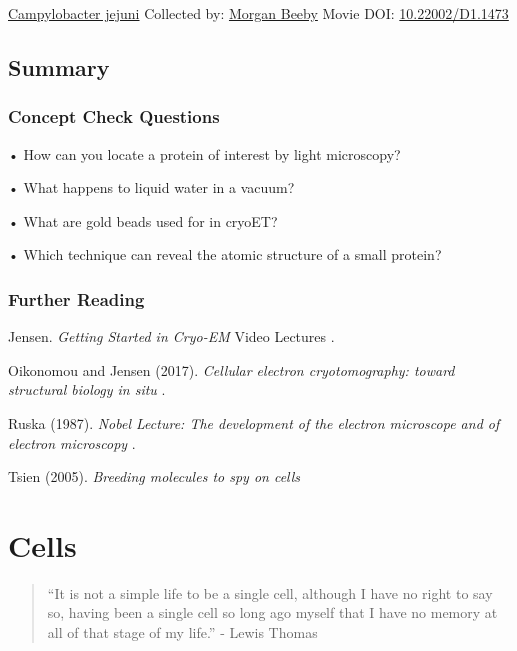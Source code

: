 \documentclass[]{tufte-book}
\begin{document}
\hypertarget{htmlwidget-12e43f16aef9ac033337}{}

\label{fig:1-10a}\protect\hyperlink{tree}{Campylobacter jejuni} Collected by: \protect\hyperlink{morgan_beeby}{Morgan Beeby} Movie DOI: \href{https://doi.org/10.22002/D1.1473}{10.22002/D1.1473}

\hypertarget{summary}{%
\section{Summary}\label{summary}}

\hypertarget{concept-check-questions}{%
\subsection*{Concept Check Questions}\label{concept-check-questions}}

• How can you locate a protein of interest by light microscopy?

• What happens to liquid water in a vacuum?

• What are gold beads used for in cryoET?

• Which technique can reveal the atomic structure of a small protein?

\hypertarget{further-reading}{%
\subsection*{Further Reading}\label{further-reading}}

Jensen. \emph{Getting Started in Cryo-EM} Video Lectures \citep{jensenInternet}.

Oikonomou and Jensen (2017). \emph{Cellular electron cryotomography: toward structural biology in situ} \citep{oikonomou2017}.

Ruska (1987). \emph{Nobel Lecture: The development of the electron microscope and of electron microscopy} \citep{ruska1987}.

Tsien (2005). \emph{Breeding molecules to spy on cells} \citep{tsien2005}

\hypertarget{cells}{%
\chapter{Cells}\label{cells}}

\begin{quote}
``It is not a simple life to be a single cell, although I have no right to say so, having been a single cell so long ago myself that I have no memory at all of that stage of my life.''
- Lewis Thomas \citep{thomas1990}
\end{quote}
\end{document}
